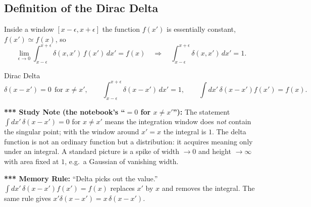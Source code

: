\documentclass[11pt,a4paper]{article}
\begin{document}
\subsection{Definition of the Dirac Delta}
Inside a window $[x-\epsilon,x+\epsilon]$ the function $f(x')$ is essentially constant, $f(x')\simeq f(x)$, so
\[
\lim_{\epsilon\to0}\int_{x-\epsilon}^{x+\epsilon}\delta(x,x')\,f(x')\,dx'=f(x)\quad\Longrightarrow\quad
\int_{x-\epsilon}^{x+\epsilon}\delta(x,x')\,dx'=1 .
\]
\begin{thm}{Dirac Delta}
\[
\delta(x-x')=0\ \ \text{for }x\neq x',\qquad \int_{x-\epsilon}^{x+\epsilon}\delta(x-x')\,dx'=1,\qquad
\int dx'\,\delta(x-x')f(x')=f(x).
\]
\end{thm}
\begin{center}
\end{center}
\textbf{*** Study Note (the notebook's ``$=0$ for $x\neq x'$''):} The statement $\int dx'\,\delta(x-x')=0$ for $x\ne x'$ means the integration window does \emph{not} contain the singular point; with the window around $x'=x$ the integral is $1$. The delta function is not an ordinary function but a distribution: it acquires meaning only under an integral. A standard picture is a spike of width $\to0$ and height $\to\infty$ with area fixed at $1$, e.g.\ a Gaussian of vanishing width.

\textbf{*** Memory Rule:} ``Delta picks out the value.'' $\int dx'\,\delta(x-x')f(x')=f(x)$ replaces $x'$ by $x$ and removes the integral. The same rule gives $x'\delta(x-x')=x\,\delta(x-x')$.
\end{document}
